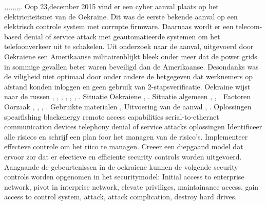 \cite{Whitehead2017ukrainepoweroutage},\cite{zetter2016GridHack},\cite{boozallen2016lightwentout},\cite{finklejan2016UsBlamesRussianSandworm},\cite{desarnaud2017cyberattacks},\cite{caseli04112016intrusiondetectioncontrolsystem},\cite{rochascadatesting},\cite{hidajat2016ScadaSimulator},\cite{zetter2017moreDangerousMalware}.
Oop 23,december 2015  vind er een cyber aanval plaats op het elektriciteitsnet van de Oekraine. Dit was de eerste bekende aanval op een elektrisch controle  system met corrupte firmware. Daarnaas wordt er een telecom-based denial of service attack met  geautomatieerde systemen om het telefoonverkeer uit te schakelen.
\cite{Whitehead2017ukrainepoweroutage}
Uit onderzoek\cite{zetter2016GridHack} naar de aanval,  uitgevoerd door Oekraiene sen Amerikaanse militairenblijkt  bleek onder meer dat de power grids in sommige gevallen beter waren beveiligd dan de Amerikaanse. Desondanks was de viligheid niet optimaal door onder andere de  hetgegeven dat werknemers op afstand konden inloggen en geen gebruik van 2-stapsverificatie.
Oekraine wijst naar de russen \cite{zetter2016GridHack}, 
\cite{greenberg2017Cyberwartestlab},
\cite{boozallen2016lightwentout},
\cite{finkle08012016russiansandwormhackers},
\cite{zinets15022017ukrainechargesrussia},
\cite{mcelfresh2016cyberattackhowandwhy},
\cite{parkwalstorm11102017russiagridattack}.
{Situatie Oekraiene}
\cite{drago2017CrashOverride},
\cite{slowik2019ReassasUkraine2016Attack}.
{Situatie algemeen}
\cite{cerulus2019FrontlineRussiaAttack},
\cite{desarnaud2017cyberattacks},
\cite{dragos2019TargetedTransStation}.
{Factoren}
\cite{shehod2016gridadvantageus}
{Oorzaak}
\cite{rocha2017cybersecyrityanalysisScada},
\cite{2017crashoverridenostuxnet},
\cite{vijayan2017firstmalwareCausedOutage},
\cite{slowik2019ReassasUkraine2016Attack}.
{Gebruikte materialen}
\cite{2015ukrainegridattack},
\cite{industroyershortfact}
{Uitvoering van de aanval}
\cite{Whitehead2017ukrainepoweroutage},
\cite{boozallen2016lightwentout}.
{Oplossingen}
~\cite{Whitehead2017ukrainepoweroutage}
\cite{Whitehead2017ukrainepoweroutage}
\cite{boozallen2016lightwentout}
{spearfishing}
{blackenergy}
{remote access capabilities}
{serial-to-ethernet communication devices}
{telephony denial of service attacks}
{oplossingen}
Identificeer alle risicos en schrijf een plan foor het managen van de risico's.
Implementeer  effecteve controle  om het riico te managen.
Creeer een diepgaand model dat ervoor zor dat er efectieve en efficiente security controls worden uitgevoerd.
Aangaande de gebeurtenissen in de oekraiene kunnen de volgende security controls worden opgenomen in het securitymodel: Initial access to enterprise network, pivot in interprise network, elevate priviliges, maintainance access, gain access to control system, attack, attack complication, destroy hard drives.
